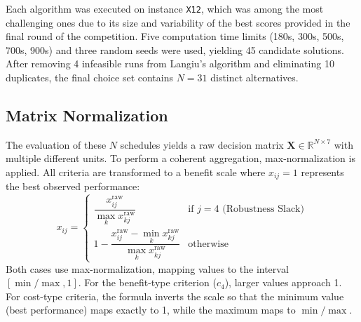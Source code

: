 Each algorithm was executed on instance \texttt{X12}, which was among the most challenging ones due to its size and variability of the best scores provided in the final round of the competition. Five computation time limits (180s, 300s, 500s, 700s, 900s) and three random seeds were used, yielding 45 candidate solutions. After removing 4 infeasible runs from Langiu's algorithm and eliminating 10 duplicates, the final choice set contains $N=31$ distinct alternatives.

\subsection{Matrix Normalization}

The evaluation of these $N$ schedules yields a raw decision matrix $\mathbf{X} \in \mathbb{R}^{N \times 7}$ with multiple different units. To perform a coherent aggregation, max-normalization is applied. All criteria are transformed to a benefit scale where $x_{ij} = 1$ represents the best observed performance:
\[
x_{ij} = \begin{cases}
\dfrac{x^{\mathrm{raw}}_{ij}}{\max_{k} x^{\mathrm{raw}}_{kj}} & \text{if } j=4 \text{ (Robustness Slack)} \\[10pt]
1 - \dfrac{x^{\mathrm{raw}}_{ij} - \min_{k} x^{\mathrm{raw}}_{kj}}{\max_{k} x^{\mathrm{raw}}_{kj}} & \text{otherwise}
\end{cases}
\]
Both cases use max-normalization, mapping values to the interval $[\min/\max, 1]$. For the benefit-type criterion ($c_4$), larger values approach 1. For cost-type criteria, the formula inverts the scale so that the minimum value (best performance) maps exactly to 1, while the maximum maps to $\min/\max$.
